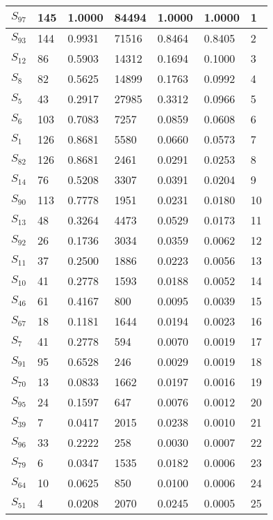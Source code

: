 \begin{xltabular}{\textwidth}{|X|X|X|X|X|X|X|}
        \hline
        \endlastfoot
    $S_{97}$ & 145 & 1.0000 & 84494 & 1.0000 & 1.0000 & 1 \\ \hline
 $S_{93}$ & 144 & 0.9931 & 71516 & 0.8464 & 0.8405 & 2 \\ \hline
 $S_{12}$ & 86 & 0.5903 & 14312 & 0.1694 & 0.1000 & 3 \\ \hline
 $S_{8}$ & 82 & 0.5625 & 14899 & 0.1763 & 0.0992 & 4 \\ \hline
 $S_{5}$ & 43 & 0.2917 & 27985 & 0.3312 & 0.0966 & 5 \\ \hline
 $S_{6}$ & 103 & 0.7083 & 7257 & 0.0859 & 0.0608 & 6 \\ \hline
 $S_{1}$ & 126 & 0.8681 & 5580 & 0.0660 & 0.0573 & 7 \\ \hline
 $S_{82}$ & 126 & 0.8681 & 2461 & 0.0291 & 0.0253 & 8 \\ \hline
 $S_{14}$ & 76 & 0.5208 & 3307 & 0.0391 & 0.0204 & 9 \\ \hline
 $S_{90}$ & 113 & 0.7778 & 1951 & 0.0231 & 0.0180 & 10 \\ \hline
 $S_{13}$ & 48 & 0.3264 & 4473 & 0.0529 & 0.0173 & 11 \\ \hline
 $S_{92}$ & 26 & 0.1736 & 3034 & 0.0359 & 0.0062 & 12 \\ \hline
 $S_{11}$ & 37 & 0.2500 & 1886 & 0.0223 & 0.0056 & 13 \\ \hline
 $S_{10}$ & 41 & 0.2778 & 1593 & 0.0188 & 0.0052 & 14 \\ \hline
 $S_{46}$ & 61 & 0.4167 & 800 & 0.0095 & 0.0039 & 15 \\ \hline
 $S_{67}$ & 18 & 0.1181 & 1644 & 0.0194 & 0.0023 & 16 \\ \hline
 $S_{7}$ & 41 & 0.2778 & 594 & 0.0070 & 0.0019 & 17 \\ \hline
 $S_{91}$ & 95 & 0.6528 & 246 & 0.0029 & 0.0019 & 18 \\ \hline
 $S_{70}$ & 13 & 0.0833 & 1662 & 0.0197 & 0.0016 & 19 \\ \hline
 $S_{95}$ & 24 & 0.1597 & 647 & 0.0076 & 0.0012 & 20 \\ \hline
 $S_{39}$ & 7 & 0.0417 & 2015 & 0.0238 & 0.0010 & 21 \\ \hline
 $S_{96}$ & 33 & 0.2222 & 258 & 0.0030 & 0.0007 & 22 \\ \hline
 $S_{79}$ & 6 & 0.0347 & 1535 & 0.0182 & 0.0006 & 23 \\ \hline
 $S_{64}$ & 10 & 0.0625 & 850 & 0.0100 & 0.0006 & 24 \\ \hline
 $S_{51}$ & 4 & 0.0208 & 2070 & 0.0245 & 0.0005 & 25 \\ \hline

\end{xltabular}
